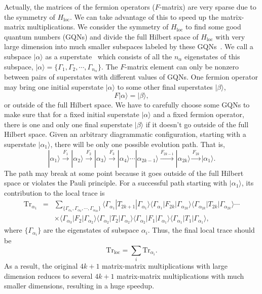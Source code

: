 Actually, the matrices of the fermion operators ($F$-matrix) are very sparse due to the symmetry of $H_{\text{loc}}$. We can take advantage of this to speed up the matrix-matrix multiplications. We consider the symmetry of $H_{\text{loc}}$ to find some good quantum numbers (GQNs) and divide the full Hilbert space of $H_{\text{loc}}$ with very large dimension into much smaller subspaces labeled by these GQNs~\cite{RevModPhys.83.349}. We call a subspace $|\alpha\rangle$ as a superstate~\cite{PhysRevB.75.155113} which consists of all the $n_{\alpha}$ eigenstates of this subspace, $|\alpha\rangle=\{ \Gamma_{1}, \Gamma_{2}, \cdots, \Gamma_{n_{\alpha}}\}$. The $F$-matrix element can only be nonzero between pairs of superstates with different values of GQNs. One fermion operator may bring one initial superstate $|\alpha\rangle$ to some other final superstates $|\beta\rangle$,
\begin{equation}\label{equ:next_sect}
F|\alpha\rangle= |\beta\rangle,
\end{equation}
or outside of the full Hilbert space. We have to carefully choose some GQNs to make sure that for a fixed initial superstate $|\alpha\rangle$ and a fixed fermion operator, there is one and only one final superstate $|\beta\rangle$ if it doesn't go outside of the full Hilbert space. Given an arbitrary diagrammatic configuration, starting with a superstate $|\alpha_{1}\rangle$, there will be only one possible evolution path. That is,
\begin{equation}
|\alpha_{1}\rangle \xrightarrow{F_{1}} 
|\alpha_{2}\rangle \xrightarrow{F_{2}} 
|\alpha_{3}\rangle \xrightarrow{F_{3}} 
|\alpha_{4}\rangle \cdots 
|\alpha_{2k-1}\rangle \xrightarrow{F_{2k-1}} 
|\alpha_{2k}\rangle   \xrightarrow{F_{2k}} 
|\alpha_{1}\rangle.
\end{equation}
The path may break at some point because it goes outside of the full Hilbert space or violates the Pauli principle. For a successful path starting with $|\alpha_{1}\rangle$, its contribution to the local trace is
\begin{eqnarray}
\text{Tr}_{\alpha_{1}} &=& 
\sum_{\{ \Gamma_{\alpha_{1}}, \Gamma_{\alpha_{2}}, \cdots, \Gamma_{\alpha_{2k}}\}}
\langle\Gamma_{\alpha_{1}}|T_{2k+1}|\Gamma_{\alpha_{1}}\rangle
\langle\Gamma_{\alpha_{1}}|F_{2k}|\Gamma_{\alpha_{2k}}\rangle
\langle\Gamma_{\alpha_{2k}}|T_{2k}|\Gamma_{\alpha_{2k}}\rangle \cdots \nonumber \\ 
& & \times 
\langle\Gamma_{\alpha_{3}}|F_{2}|\Gamma_{\alpha_{2}}\rangle
\langle\Gamma_{\alpha_{2}}|T_{2}|\Gamma_{\alpha_{2}}\rangle
\langle\Gamma_{\alpha_{2}}|F_{1}|\Gamma_{\alpha_{1}}\rangle
\langle\Gamma_{\alpha_{1}}|T_{1}|\Gamma_{\alpha_{1}}\rangle,
\end{eqnarray}
where $\{ \Gamma_{\alpha_{i}} \}$ are the eigenstates of subspace $\alpha_{i}$. Thus, the final local trace should be
\begin{equation}
\text{Tr}_{\text{loc}} = \sum_{i} \text{Tr}_{\alpha_{i}}.
\end{equation} 
As a result, the original $4k+1$ matrix-matrix multiplications with large dimension reduces to several $4k+1$ matrix-matrix multiplications with much smaller dimensions, resulting in a huge speedup.

